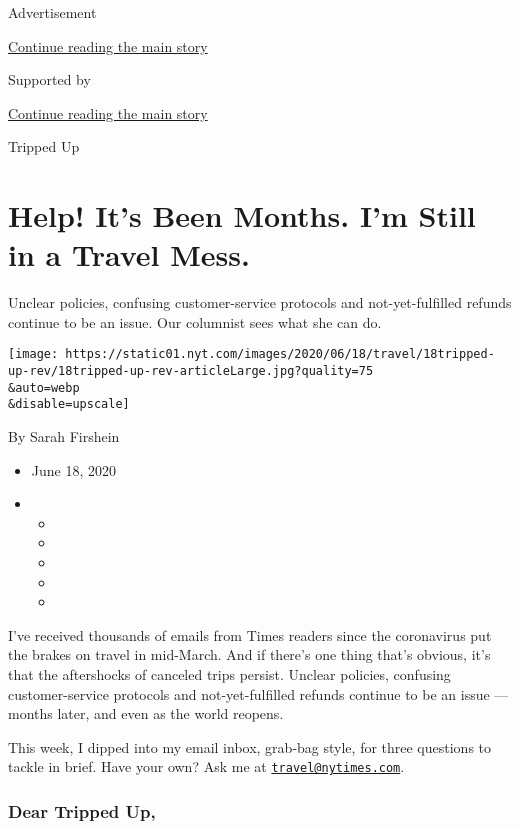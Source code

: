 Advertisement

\protect\hyperlink{after-top}{Continue reading the main story}

Supported by

\protect\hyperlink{after-sponsor}{Continue reading the main story}

Tripped Up

\hypertarget{help-its-been-months-im-still-in-a-travel-mess}{%
\section{Help! It's Been Months. I'm Still in a Travel
Mess.}\label{help-its-been-months-im-still-in-a-travel-mess}}

Unclear policies, confusing customer-service protocols and
not-yet-fulfilled refunds continue to be an issue. Our columnist sees
what she can do.

\texttt{[image: https://static01.nyt.com/images/2020/06/18/travel/18tripped-up-rev/18tripped-up-rev-articleLarge.jpg?quality=75\\\&auto=webp\\\&disable=upscale]}

By Sarah Firshein

\begin{itemize}
\item
  June 18, 2020
\item
  \begin{itemize}
  \item
  \item
  \item
  \item
  \item
  \end{itemize}
\end{itemize}

I've received thousands of emails from Times readers since the
coronavirus put the brakes on travel in mid-March. And if there's one
thing that's obvious, it's that the aftershocks of canceled trips
persist. Unclear policies, confusing customer-service protocols and
not-yet-fulfilled refunds continue to be an issue --- months later, and
even as the world reopens.

This week, I dipped into my email inbox, grab-bag style, for three
questions to tackle in brief. Have your own? Ask me at
\href{mailto:travel@nytimes.com}{\nolinkurl{travel@nytimes.com}}.

\hypertarget{dear-tripped-up}{%
\subsubsection{\texorpdfstring{\textbf{Dear Tripped
Up,}}{Dear Tripped Up,}}\label{dear-tripped-up}}

